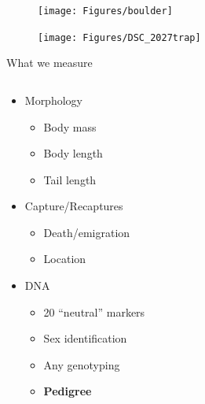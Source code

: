 \documentclass[10pt]{beamer}%
\begin{document}
\begin{frame}
	\begin{figure}
	\centering
		\texttt{[image: Figures/boulder]}
	\end{figure}
\end{frame}

\begin{frame}
	\begin{figure}
	\centering
		\texttt{[image: Figures/DSC\_2027trap]}
	\end{figure}
\end{frame}

\begin{frame}{What we measure}

\begin{columns}
	\begin{column}[c]{0.4\textwidth}
		\begin{itemize}
			\item<2-> Morphology
				\begin{itemize}
					\item Body mass 
					\item Body length
					\item Tail length
				\end{itemize}
			\item<3-> Capture/Recaptures
				\begin{itemize}
					\item Death/emigration
					\item Location
				\end{itemize}
			\item<4-> DNA
				\begin{itemize}
					\item 20 ``neutral'' markers
					\item Sex identification
					\item Any genotyping
					\item<5-> \textbf{Pedigree}
				\end{itemize}
		\end{itemize}
	\end{column}
	
	\begin{column}[c]{0.6\textwidth}


\end{column}
\end{columns}
\end{frame}
\end{document}
